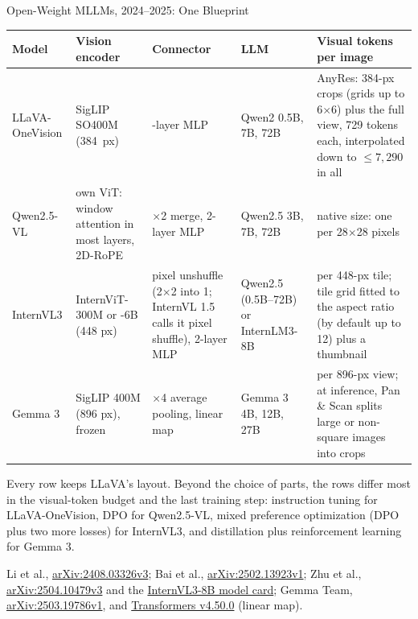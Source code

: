 \begin{frame}{Open-Weight MLLMs, 2024--2025: One Blueprint}

  {\centering\scriptsize\setlength{\tabcolsep}{3pt}
  \begin{tabular}{>{\raggedright\arraybackslash}p{1.9cm} >{\raggedright\arraybackslash}p{2.6cm} >{\raggedright\arraybackslash}p{2.3cm} >{\raggedright\arraybackslash}p{2.0cm} >{\raggedright\arraybackslash}p{4.0cm}}
    \toprule
    \textbf{Model} & \textbf{Vision encoder} & \textbf{Connector} & \textbf{LLM} & \textbf{Visual tokens per image} \\
    \midrule
    LLaVA-OneVision & SigLIP SO400M (384~px) & 2-layer MLP & Qwen2 0.5B, 7B, 72B & AnyRes: 384-px crops (grids up to 6$\times$6) plus the full view, 729 tokens each, interpolated down to $\leq 7{,}290$ in all \\
    \addlinespace[0.2em]
    Qwen2.5-VL & own ViT: window attention in most layers, 2D-RoPE & 2$\times$2 merge, 2-layer MLP & Qwen2.5 3B, 7B, 72B & native size: one per 28$\times$28 pixels \\
    \addlinespace[0.2em]
    InternVL3 & InternViT-300M or -6B (448 px) & pixel unshuffle (2$\times$2 into 1; InternVL 1.5 calls it pixel shuffle), 2-layer MLP & Qwen2.5 (0.5B--72B) or InternLM3-8B & 256 per 448-px tile; tile grid fitted to the aspect ratio (by default up to 12) plus a thumbnail \\
    \addlinespace[0.2em]
    Gemma 3 & SigLIP 400M (896 px), frozen & 4$\times$4 average pooling, linear map & Gemma 3 4B, 12B, 27B & 256 per 896-px view; at inference, Pan \& Scan splits large or non-square images into crops \\
    \bottomrule
  \end{tabular}\par}
  \vspace{0.3em}
  {\footnotesize Every row keeps LLaVA's layout. Beyond the choice of parts, the rows differ most in the visual-token budget and the last training step: instruction tuning for LLaVA-OneVision, DPO for Qwen2.5-VL, mixed preference optimization (DPO plus two more losses) for InternVL3, and distillation plus reinforcement learning for Gemma 3.\par}
  \vspace{0.3em}
  {\scriptsize Li et al., \href{https://arxiv.org/abs/2408.03326v3}{arXiv:2408.03326v3}; Bai et al., \href{https://arxiv.org/abs/2502.13923v1}{arXiv:2502.13923v1}; Zhu et al., \href{https://arxiv.org/abs/2504.10479v3}{arXiv:2504.10479v3} and the \href{https://huggingface.co/OpenGVLab/InternVL3-8B}{InternVL3-8B model card}; Gemma Team, \href{https://arxiv.org/abs/2503.19786v1}{arXiv:2503.19786v1}, and \href{https://github.com/huggingface/transformers/blob/v4.50.0/src/transformers/models/gemma3/modeling_gemma3.py}{Transformers v4.50.0} (linear map).\par}
\end{frame}
